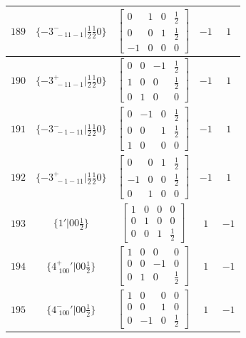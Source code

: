 \documentclass[fleqn,8pt]{jsarticle}
\begin{document}
\begin{longtable}{ccccc}
$ 189 $ & $ \{-3^{-}_{\,\,-11-1}|\frac{1}{2} \frac{1}{2} 0\} $ & $ \begin{bmatrix} 0 & 1 & 0 & \frac{1}{2} \\ 0 & 0 & 1 & \frac{1}{2} \\ -1 & 0 & 0 & 0 \end{bmatrix} $ & $ -1 $ & $ 1 $ \\ \hline
$ 190 $ & $ \{-3^{+}_{\,\,-11-1}|\frac{1}{2} \frac{1}{2} 0\} $ & $ \begin{bmatrix} 0 & 0 & -1 & \frac{1}{2} \\ 1 & 0 & 0 & \frac{1}{2} \\ 0 & 1 & 0 & 0 \end{bmatrix} $ & $ -1 $ & $ 1 $ \\ \hline
$ 191 $ & $ \{-3^{-}_{\,\,-1-11}|\frac{1}{2} \frac{1}{2} 0\} $ & $ \begin{bmatrix} 0 & -1 & 0 & \frac{1}{2} \\ 0 & 0 & 1 & \frac{1}{2} \\ 1 & 0 & 0 & 0 \end{bmatrix} $ & $ -1 $ & $ 1 $ \\ \hline
$ 192 $ & $ \{-3^{+}_{\,\,-1-11}|\frac{1}{2} \frac{1}{2} 0\} $ & $ \begin{bmatrix} 0 & 0 & 1 & \frac{1}{2} \\ -1 & 0 & 0 & \frac{1}{2} \\ 0 & 1 & 0 & 0 \end{bmatrix} $ & $ -1 $ & $ 1 $ \\ \hline
$ 193 $ & $ \{1{}'|0 0 \frac{1}{2}\} $ & $ \begin{bmatrix} 1 & 0 & 0 & 0 \\ 0 & 1 & 0 & 0 \\ 0 & 0 & 1 & \frac{1}{2} \end{bmatrix} $ & $ 1 $ & $ -1 $ \\ \hline
$ 194 $ & $ \{4^{+}_{\,\,100}{}'|0 0 \frac{1}{2}\} $ & $ \begin{bmatrix} 1 & 0 & 0 & 0 \\ 0 & 0 & -1 & 0 \\ 0 & 1 & 0 & \frac{1}{2} \end{bmatrix} $ & $ 1 $ & $ -1 $ \\ \hline
$ 195 $ & $ \{4^{-}_{\,\,100}{}'|0 0 \frac{1}{2}\} $ & $ \begin{bmatrix} 1 & 0 & 0 & 0 \\ 0 & 0 & 1 & 0 \\ 0 & -1 & 0 & \frac{1}{2} \end{bmatrix} $ & $ 1 $ & $ -1 $ \\ \hline

\end{longtable}
\end{document}
